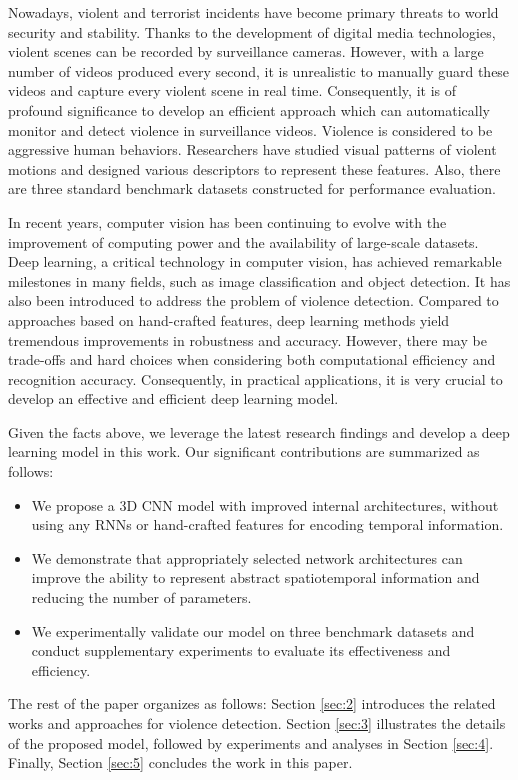 \documentclass[10pt,twocolumn,letterpaper]{article}
\begin{document}
Nowadays, violent and terrorist incidents have become primary threats to world security and stability.
Thanks to the development of digital media technologies, violent scenes can be recorded by surveillance cameras.
However, with a large number of videos produced every second, it is unrealistic to manually guard these videos and capture every violent scene in real time.
Consequently, it is of profound significance to develop an efficient approach which can automatically monitor and detect violence in surveillance videos.
Violence is considered to be aggressive human behaviors.
Researchers have studied visual patterns of violent motions and designed various descriptors to represent these features.
Also, there are three standard benchmark datasets constructed for performance evaluation.

In recent years, computer vision has been continuing to evolve with the improvement of computing power and the availability of large-scale datasets.
Deep learning, a critical technology in computer vision, has achieved remarkable milestones in many fields, such as image classification and object detection.
It has also been introduced to address the problem of violence detection.
Compared to approaches based on hand-crafted features, deep learning methods yield tremendous improvements in robustness and accuracy.
However, there may be trade-offs and hard choices when considering both computational efficiency and recognition accuracy.
Consequently, in practical applications, it is very crucial to develop an effective and efficient deep learning model.

Given the facts above, we leverage the latest research findings and develop a deep learning model in this work.
Our significant contributions are summarized as follows:
\begin{itemize}
	\item We propose a 3D CNN model with improved internal architectures, without using any RNNs or hand-crafted features for encoding temporal information.
	\item We demonstrate that appropriately selected network architectures can improve the ability to represent abstract spatiotemporal information and reducing the number of parameters.
	\item We experimentally validate our model on three benchmark datasets and conduct supplementary experiments to evaluate its effectiveness and efficiency.
\end{itemize}

The rest of the paper organizes as follows:
Section \ref{sec:2} introduces the related works and approaches for violence detection.
Section \ref{sec:3} illustrates the details of the proposed model, followed by experiments and analyses in Section \ref{sec:4}.
Finally, Section \ref{sec:5} concludes the work in this paper.
\end{document}
